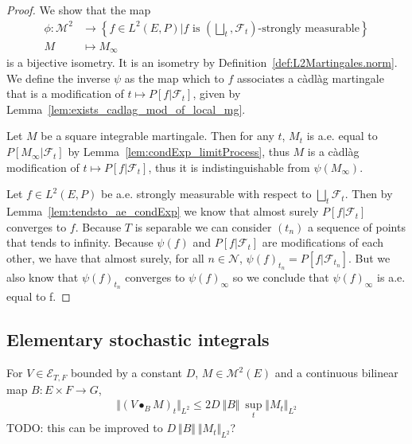 \begin{proof}
  We show that the map
  \begin{align*}
    \phi : \mathcal{M}^2 & \to \left\{f \in L^2(E, P) | f \text{ is } \left(\bigsqcup_t, \mathcal{F}_t\right)\text{-strongly measurable}\right\} \\
    M & \mapsto M_\infty
  \end{align*}
  is a bijective isometry. It is an isometry by Definition~\ref{def:L2Martingales.norm}. We define the inverse $\psi$ as the map which to $f$ associates a càdlàg martingale that is a modification of $t \mapsto P[f | \mathcal{F}_t]$, given by Lemma~\ref{lem:exists_cadlag_mod_of_local_mg}.

  Let $M$ be a square integrable martingale. Then for any $t$, $M_t$ is a.e. equal to $P[M_\infty | \mathcal{F}_t]$ by Lemma~\ref{lem:condExp_limitProcess}, thus $M$ is a càdlàg modification of $t \mapsto P[f | \mathcal{F}_t]$, thus it is indistinguishable from $\psi(M_\infty)$.

  Let $f \in L^2(E, P)$ be a.e. strongly measurable with respect to $\bigsqcup_t \mathcal{F}_t$. Then by Lemma~\ref{lem:tendsto_ae_condExp} we know that almost surely $P[f | \mathcal{F}_t]$ converges to $f$. Because $T$ is separable we can consider $(t_n)$ a sequence of points that tends to infinity. Because $\psi(f)$ and $P[f | \mathcal{F}_t]$ are modifications of each other, we have that almost surely, for all $n \in \mathcal{N}$, $\psi(f)_{t_n} = P[f | \mathcal{F}_{t_n}]$. But we also know that $\psi(f)_{t_n}$ converges to $\psi(f)_\infty$ so we conclude that $\psi(f)_\infty$ is a.e. equal to f.
\end{proof}





\subsection{Elementary stochastic integrals}

\begin{lemma}\label{lem:eLpNorm_elemStochIntegralBilin_le}
For $V \in \mathcal{E}_{T, F}$ bounded by a constant $D$, $M \in \mathcal{M}^2(E)$ and a continuous bilinear map $B: E \times F \to G$,
\begin{align*}
  \Vert (V \bullet_B M)_t \Vert_{L^2}
  \le 2 D \: \Vert B \Vert \: \sup_t \Vert M_t \Vert_{L^2}
\end{align*}
TODO: this can be improved to $D \: \Vert B \Vert \: \Vert M_t \Vert_{L^2}$?
\end{lemma}

